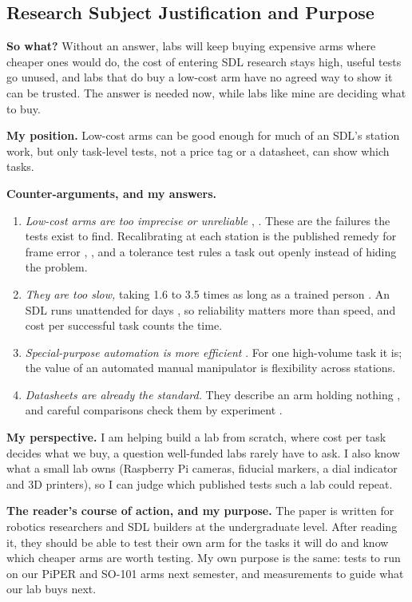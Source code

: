 \subsection{Research Subject Justification and Purpose}

\textbf{So what?} Without an answer, labs will keep buying expensive arms where cheaper ones
would do, the cost of entering SDL research stays high, useful tests go unused, and labs that do
buy a low-cost arm have no agreed way to show it can be trusted. The answer is needed now, while
labs like mine are deciding what to buy.

\textbf{My position.} Low-cost arms can be good enough for much of an SDL's station work, but
only task-level tests, not a price tag or a datasheet, can show which tasks.

\textbf{Counter-arguments, and my answers.}
\begin{enumerate}[1.]
  \item \emph{Low-cost arms are too imprecise or unreliable} \cite{rupp2022},
    \cite{wattoo2024}. These are the failures the tests exist to find. Recalibrating at each
    station is the published remedy for frame error \cite{burger2020}, \cite{zhou2025}, and a
    tolerance test rules a task out openly instead of hiding the problem.
  \item \emph{They are too slow,} taking 1.6 to 3.5 times as long as a trained person
    \cite{rupp2022}. An SDL runs unattended for days \cite{burger2020}, so reliability matters
    more than speed, and cost per successful task counts the time.
  \item \emph{Special-purpose automation is more efficient} \cite{tom2024}. For one high-volume
    task it is; the value of an automated manual manipulator is flexibility across stations.
  \item \emph{Datasheets are already the standard.} They describe an arm holding nothing
    \cite{harazono2024}, and careful comparisons check them by experiment
    \cite{ferraguti2019}.
\end{enumerate}

\textbf{My perspective.} I am helping build a lab from scratch, where cost per task decides
what we buy, a question well-funded labs rarely have to ask. I also know what a small lab owns
(Raspberry Pi cameras, fiducial markers, a dial indicator and 3D printers), so I can judge which
published tests such a lab could repeat.

\textbf{The reader's course of action, and my purpose.} The paper is written for robotics
researchers and SDL builders at the undergraduate level. After reading it, they should be able
to test their own arm for the tasks it will do and know which cheaper arms are worth testing.
My own purpose is the same: tests to run on our PiPER and SO-101 arms next semester, and
measurements to guide what our lab buys next.
